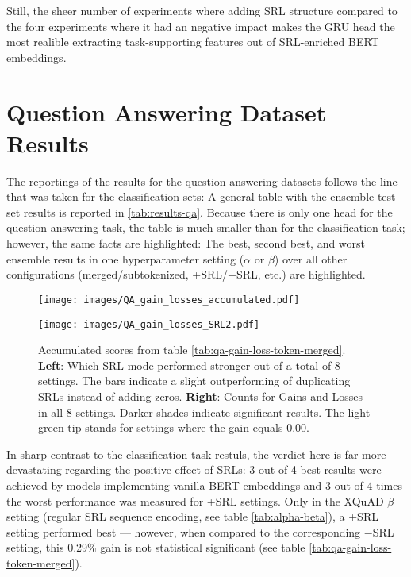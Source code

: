 Still, the sheer number of experiments where adding SRL structure compared to the four experiments
where it had an negative impact makes the GRU head the most realible extracting task-supporting
features out of SRL-enriched BERT embeddings.

\section{Question Answering Dataset Results}
\label{sec:qa-results}

The reportings of the results for the question answering datasets follows the line that was taken
for the classification sets: A general table with the ensemble test set results is reported in
\ref{tab:results-qa}. Because there is only one head for the question answering task, the table is
much smaller than for the classification task; however, the same facts are highlighted: The best,
second best, and worst ensemble results in one hyperparameter setting ($\alpha$ or $\beta$) over
all other configurations (merged/subtokenized, +SRL/$-$SRL, etc.) are highlighted.

\begin{figure}
  \begin{minipage}{0.45\linewidth}
  \vspace{0pt}
    \texttt{[image: images/QA\_gain\_losses\_accumulated.pdf]}
  \end{minipage}
  \hfill
  \begin{minipage}{0.45\linewidth}
  \vspace{0pt}
    \texttt{[image: images/QA\_gain\_losses\_SRL2.pdf]}
  \end{minipage}
  \caption[Accumulated Gains and Losses.]{Accumulated scores from table \ref{tab:qa-gain-loss-token-merged}. \textbf{Left}: Which SRL mode performed stronger out of a total of 8 settings. The bars indicate a slight outperforming of duplicating SRLs instead of adding zeros. \textbf{Right}: Counts for Gains and Losses in all 8 settings. Darker shades indicate significant results. The light green tip stands for settings where the gain equals 0.00.}
  \label{fig:qa-tot-gains}
\end{figure}

In sharp contrast to the classification task restuls, the verdict here is far more devastating
regarding the positive effect of SRLs: 3 out of 4 best results were achieved by models implementing
vanilla BERT embeddings and 3 out of 4 times the worst performance was measured for +SRL settings.
Only in the XQuAD $\beta$ setting (regular SRL sequence encoding, see table \ref{tab:alpha-beta}),
a +SRL setting performed best --- however, when compared to the corresponding $-$SRL setting, this
0.29\% gain is not statistical significant (see table \ref{tab:qa-gain-loss-token-merged}).

